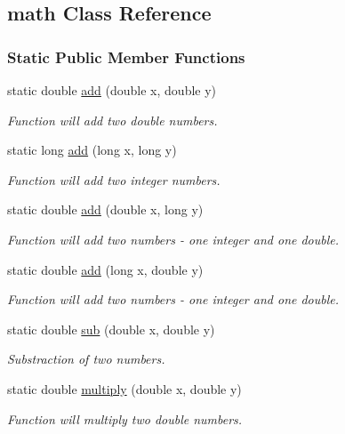 \hypertarget{classmath}{}\subsection{math Class Reference}
\label{classmath}
\subsubsection*{Static Public Member Functions}
\begin{DoxyCompactItemize}
\item 
static double \hyperlink{classmath_aedbba5022af9004b0203aea54267aa47}{add} (double x, double y)
\begin{DoxyCompactList}\small\item\em Function will add two double numbers. \end{DoxyCompactList}\item 
static long \hyperlink{classmath_a13ad6680f54a9900e657909c9bd4452e}{add} (long x, long y)
\begin{DoxyCompactList}\small\item\em Function will add two integer numbers. \end{DoxyCompactList}\item 
static double \hyperlink{classmath_a72d851503e310afe7d44b6c24e40aa7a}{add} (double x, long y)
\begin{DoxyCompactList}\small\item\em Function will add two numbers -\/ one integer and one double. \end{DoxyCompactList}\item 
static double \hyperlink{classmath_a2470ffa51c860423010e4550ee7caa4a}{add} (long x, double y)
\begin{DoxyCompactList}\small\item\em Function will add two numbers -\/ one integer and one double. \end{DoxyCompactList}\item 
static double \hyperlink{classmath_a6a9bec211856c5b6cccf6062826ff758}{sub} (double x, double y)
\begin{DoxyCompactList}\small\item\em Substraction of two numbers. \end{DoxyCompactList}\item 
static double \hyperlink{classmath_a2be9a72bde751de9d7b949d2b917d2b0}{multiply} (double x, double y)
\begin{DoxyCompactList}\small\item\em Function will multiply two double numbers. \end{DoxyCompactList}\item 

\end{DoxyCompactItemize}
